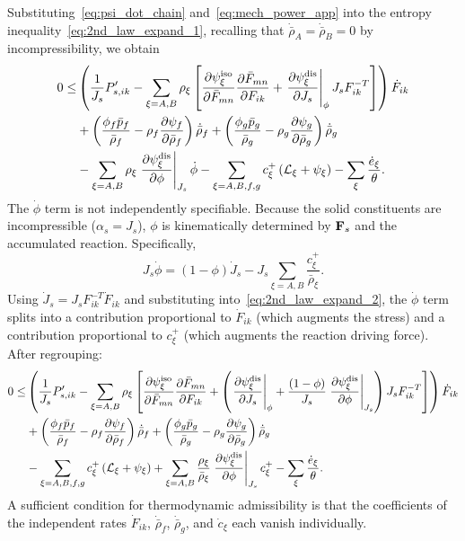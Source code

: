 Substituting~\eqref{eq:psi_dot_chain} and~\eqref{eq:mech_power_app} into the entropy inequality~\eqref{eq:2nd_law_expand_1}, recalling that $\dot{\bar\rho}_A = \dot{\bar\rho}_B = 0$ by incompressibility, we obtain
\begin{align}
  0 \leq & \left(\frac{1}{J_s} P'_{s,ik} - \sum_{\xi=A,B} \rho_\xi \left[\frac{\partial \psi^{\text{iso}}_\xi}{\partial \bar{F}_{mn}} \frac{\partial \bar{F}_{mn}}{\partial F_{ik}} + \left.\frac{\partial \psi^\text{dis}_\xi}{\partial J_s}\right\vert_\phi J_s F^{-T}_{ik}\right]\right) \dot{F}_{ik} \notag \\
  & + \left(\frac{\phi_f \bar{p}_f}{\bar\rho_f} - \rho_f \frac{\partial \psi_f}{\partial \bar\rho_f}\right) \dot{\bar\rho}_f + \left(\frac{\phi_g \bar{p}_g}{\bar\rho_g} - \rho_g \frac{\partial \psi_g}{\partial \bar\rho_g}\right) \dot{\bar\rho}_g \notag \\
  & - \sum_{\xi=A,B} \rho_\xi \left.\frac{\partial \psi^\text{dis}_\xi}{\partial \phi}\right\vert_{J_s}\dot\phi - \sum_{\xi=A,B,f,g} c^{+}_\xi \left(\mathcal{L}_\xi + \psi_\xi\right) - \sum_\xi \frac{\dot e_\xi}{\theta}.
  \label{eq:2nd_law_expand_2}
\end{align}
The $\dot\phi$ term is not independently specifiable.  Because the solid constituents are incompressible ($\alpha_s = J_s$), $\phi$ is kinematically determined by $\mathbf{F}_s$ and the accumulated reaction.  Specifically,
\begin{equation}
  J_s \dot\phi = (1-\phi)\dot{J}_s - J_s\sum_{\xi=A,B}\frac{c^+_\xi}{\bar\rho_\xi}.
  \label{eq:phi_dot_sub}
\end{equation}
Using $\dot{J}_s = J_s F^{-T}_{ik}\dot{F}_{ik}$ and substituting into~\eqref{eq:2nd_law_expand_2}, the $\dot\phi$ term splits into a contribution proportional to $\dot{F}_{ik}$ (which augments the stress) and a contribution proportional to $c^+_\xi$ (which augments the reaction driving force).  After regrouping:
\begin{align}
  0 \leq & \left(\frac{1}{J_s} P'_{s,ik} - \sum_{\xi=A,B} \rho_\xi \left[\frac{\partial \psi^{\text{iso}}_\xi}{\partial \bar{F}_{mn}} \frac{\partial \bar{F}_{mn}}{\partial F_{ik}} + \left(\left.\frac{\partial \psi^\text{dis}_\xi}{\partial J_s}\right\vert_\phi + \frac{(1-\phi)}{J_s}\left.\frac{\partial \psi^\text{dis}_\xi}{\partial \phi}\right\vert_{J_s}\right) J_s F^{-T}_{ik}\right]\right) \dot{F}_{ik} \notag \\
  & + \left(\frac{\phi_f \bar{p}_f}{\bar\rho_f} - \rho_f \frac{\partial \psi_f}{\partial \bar\rho_f}\right) \dot{\bar\rho}_f + \left(\frac{\phi_g \bar{p}_g}{\bar\rho_g} - \rho_g \frac{\partial \psi_g}{\partial \bar\rho_g}\right) \dot{\bar\rho}_g \notag \\
  & - \sum_{\xi=A,B,f,g} c^{+}_\xi \left(\mathcal{L}_\xi + \psi_\xi\right) + \sum_{\xi=A,B}\frac{\rho_\xi}{\bar\rho_\xi} \left.\frac{\partial \psi^\text{dis}_\xi}{\partial \phi}\right\vert_{J_s} c^+_\xi - \sum_\xi \frac{\dot e_\xi}{\theta}.
  \label{eq:2nd_law_expand_3}
\end{align}
A sufficient condition for thermodynamic admissibility is that the coefficients of the independent rates $\dot{F}_{ik}$, $\dot{\bar\rho}_f$, $\dot{\bar\rho}_g$, and $\dot{c}_\xi$ each vanish individually.

